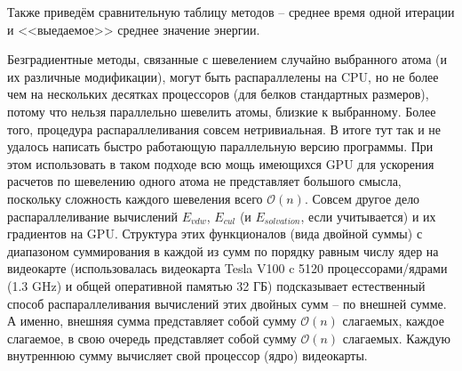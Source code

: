   Также приведём сравнительную таблицу методов -- среднее время одной итерации и <<выедаемое>> среднее значение энергии.
  \fi

  \begin{table}[h]
  	\caption{Сравнение характеристик методов}
  	\label{tabular:timesandtenses}
  	\centering
  \end{table}

  Безградиентные методы, связанные с шевелением случайно выбранного атома (и их различные модификации), могут быть распараллелены на CPU, но не более чем на нескольких десятках процессоров (для белков стандартных размеров), потому что нельзя параллельно шевелить атомы, близкие к выбранному. Более того, процедура распараллеливания совсем нетривиальная. В итоге тут так и не удалось написать быстро работающую параллельную версию программы. При этом использовать в таком подходе всю мощь имеющихся GPU для ускорения расчетов по шевелению одного атома не представляет большого смысла, поскольку сложность каждого шевеления всего $\mathcal{O}\left( n \right)$. Совсем другое дело распараллеливание вычислений $E_{vdw}$, $E_{cul}$ (и $E_{solvation}$, если учитывается) и их градиентов на GPU. Структура этих функционалов (вида двойной суммы) с диапазоном суммирования в каждой из сумм по порядку равным числу ядер на видеокарте (использовалась видеокарта Tesla V100 c 5120 процессорами/ядрами (1.3 GHz) и общей оперативной памятью 32 ГБ) подсказывает естественный способ распараллеливания вычислений этих двойных сумм -- по внешней сумме. А именно, внешняя сумма представляет собой сумму $\mathcal{O}\left( n \right)$ слагаемых, каждое слагаемое, в свою очередь представляет собой сумму $\mathcal{O}\left( n \right)$ слагаемых. Каждую внутреннюю сумму вычисляет свой процессор (ядро) видеокарты. 

